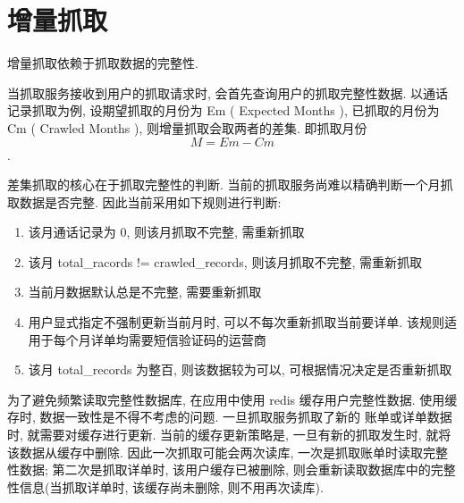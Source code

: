 \documentclass[UTF8, heading=true, schema=chinese]{ctexart}
\begin{document}
\section{增量抓取}
增量抓取依赖于抓取数据的完整性.

当抓取服务接收到用户的抓取请求时, 会首先查询用户的抓取完整性数据. 以通话记录抓取为例, 设期望抓取的月份为 Em ( Expected Months ),
已抓取的月份为 Cm ( Crawled Months ), 则增量抓取会取两者的差集. 即抓取月份 $$ M = Em - Cm $$.

差集抓取的核心在于抓取完整性的判断. 当前的抓取服务尚难以精确判断一个月抓取数据是否完整. 因此当前采用如下规则进行判断:
\begin{enumerate}
	\item 该月通话记录为 0, 则该月抓取不完整, 需重新抓取
	\item 该月 total_racords != crawled_records, 则该月抓取不完整, 需重新抓取
	\item 当前月数据默认总是不完整, 需要重新抓取
	\item 用户显式指定不强制更新当前月时, 可以不每次重新抓取当前要详单. 该规则适用于每个月详单均需要短信验证码的运营商
	\item 该月 total_records 为整百, 则该数据较为可以, 可根据情况决定是否重新抓取
\end{enumerate}

为了避免频繁读取完整性数据库, 在应用中使用 redis 缓存用户完整性数据. 使用缓存时, 数据一致性是不得不考虑的问题. 一旦抓取服务抓取了新的
账单或详单数据时, 就需要对缓存进行更新. 当前的缓存更新策略是, 一旦有新的抓取发生时, 就将该数据从缓存中删除. 因此一次抓取可能会两次读库,
一次是抓取账单时读取完整性数据; 第二次是抓取详单时, 该用户缓存已被删除, 则会重新读取数据库中的完整性信息(当抓取详单时, 该缓存尚未删除, 
则不用再次读库). 
\end{document}
